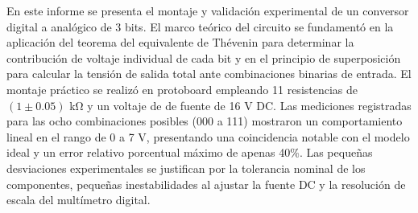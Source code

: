 En este informe se presenta el montaje y validación experimental de un conversor digital a analógico de 3 bits. El marco teórico del circuito se fundamentó en la aplicación del teorema del equivalente de Thévenin para determinar la contribución de voltaje individual de cada bit y en el principio de superposición para calcular la tensión de salida total ante combinaciones binarias de entrada. El montaje práctico se realizó en protoboard empleando 11 resistencias de $(1\pm0.05)$ \unit{\kilo\ohm} y un voltaje de de fuente de 16 \unit{\volt} DC. Las mediciones registradas para las ocho combinaciones posibles (000 a 111) mostraron un comportamiento lineal en el rango de 0 a 7 \unit{\volt}, presentando una coincidencia notable con el modelo ideal y un error relativo porcentual máximo de apenas 40\%. Las pequeñas desviaciones experimentales se justifican por la tolerancia nominal de los componentes, pequeñas inestabilidades al ajustar la fuente DC y la resolución de escala del multímetro digital.
